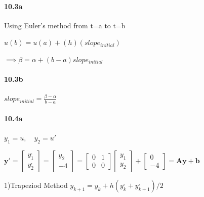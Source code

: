 \documentclass[a4paper, 11pt]{article}
\begin{document}
	\paragraph{10.3a}
	
	Using Euler's method from t=a to t=b
	
	$u(b)=u(a)+(h)(slope_{initial})$
	
	$\implies\beta=\alpha+(b-a)slope_{initial}$
	
	
	\paragraph{10.3b}
	
	$slope_{initial}=\frac{\beta-\alpha}{b-a}$
	
	
	\paragraph{10.4a}
	
	$y_{1}=u,\quad y_{2}=u'$
	
	$\mathbf{y}'=\left[\begin{array}{c}
	y_{1}^{,}\\
	y_{2}^{,}
	\end{array}\right]=\left[\begin{array}{c}
	y_{2}\\
	-4
	\end{array}\right]=\left[\begin{array}{cc}
	0 & 1\\
	0 & 0
	\end{array}\right]\left[\begin{array}{c}
	y_{1}\\
	y_{2}
	\end{array}\right]+\left[\begin{array}{c}
	0\\
	-4
	\end{array}\right]=\mathbf{Ay+b}$
	
	1)Trapeziod Method $y_{k+1}=y_{k}+h(y_{k}^{,}+y_{k+1}^{,})/2$
	
\end{document}

